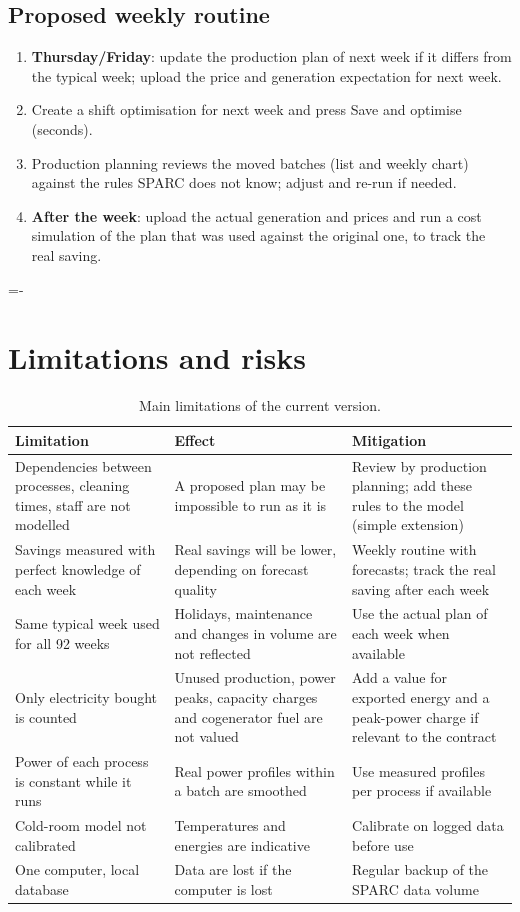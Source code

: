 \documentclass[10pt,a4paper]{scrartcl}
\makeatletter
\renewcommand{\emph}[1]{\textcolor{accent}{#1}}
\newcommand{\NeedSpace}[1]{\par\begingroup\dimen@=\pagegoal\advance\dimen@-\pagetotal
    \ifdim\dimen@<#1\relax\newpage\fi\endgroup}
\newcommand{\RuleSection}[1]{%
    \NeedSpace{10\baselineskip}%
    \section{#1}%
    \vspace{0.2em}{\color{accent!35}\hrule height 0.4pt}\vspace{0.3em}%
  }
\makeatother
\begin{document}
  \subsection{Proposed weekly routine}

  \begin{enumerate}
    \item \textbf{Thursday/Friday}: update the production plan of next week if it differs from the
      typical week; upload the price and generation expectation for next week.
    \item Create a shift optimisation for next week and press \emph{Save and optimise}
      (seconds).
    \item Production planning reviews the moved batches (list and weekly chart) against the rules
      SPARC does not know; adjust and re-run if needed.
    \item \textbf{After the week}: upload the actual generation and prices and run a cost
      simulation of the plan that was used against the original one, to track the real saving.
  \end{enumerate}

  \RuleSection{Limitations and risks}
  \label{sec:limits}

  \begin{table}[H]
  \small
  \centering
  \renewcommand{\arraystretch}{1.2}
  \begin{tabularx}{\textwidth}{@{}L{4.3cm} Y Y@{}}
  \toprule
  \textbf{Limitation} & \textbf{Effect} & \textbf{Mitigation} \\
  \midrule
  Dependencies between processes, cleaning times, staff are not modelled &
    A proposed plan may be impossible to run as it is &
    Review by production planning; add these rules to the model (simple extension) \\
  Savings measured with perfect knowledge of each week &
    Real savings will be lower, depending on forecast quality &
    Weekly routine with forecasts; track the real saving after each week \\
  Same typical week used for all 92 weeks &
    Holidays, maintenance and changes in volume are not reflected &
    Use the actual plan of each week when available \\
  Only electricity bought is counted &
    Unused production, power peaks, capacity charges and cogenerator fuel are not valued &
    Add a value for exported energy and a peak-power charge if relevant to the contract \\
  Power of each process is constant while it runs &
    Real power profiles within a batch are smoothed &
    Use measured profiles per process if available \\
  Cold-room model not calibrated &
    Temperatures and energies are indicative &
    Calibrate on logged data before use \\
  One computer, local database &
    Data are lost if the computer is lost &
    Regular backup of the SPARC data volume \\
  \bottomrule
  \end{tabularx}
  \caption{Main limitations of the current version.}
  \end{table}
\end{document}

